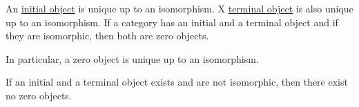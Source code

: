 \begin{proposition}\label{thm:def:zero_object/properties}
  \hfill
  \begin{thmenum}
     An \hyperref[def:zero_objects/initial]{initial object} is unique up to an isomorphism.
     X \hyperref[def:zero_objects/initial]{terminal object} is also unique up to an isomorphism.
     If a category has an initial and a terminal object and if they are isomorphic, then both are zero objects.

    In particular, a zero object is unique up to an isomorphism.

     If an initial and a terminal object exists and are not isomorphic, then there exist no zero objects.
  \end{thmenum}
\end{proposition}
